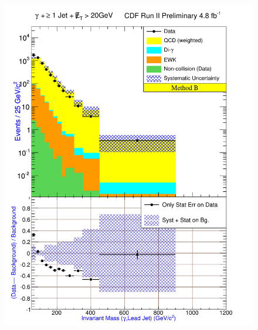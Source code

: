 \documentclass[12pt,twoside,letterpaper,doublespace]{article}
\begin{document}
\begin{figure}[h!]
{\includegraphics[keepaspectratio=true, scale=\figScale]{G30JetsMet20_MtdB_plot1_InvMass_pj1.pdf}}
\label{fig:pjmetMtdBSetOne}
\end{figure}
\clearpage
\end{document}
